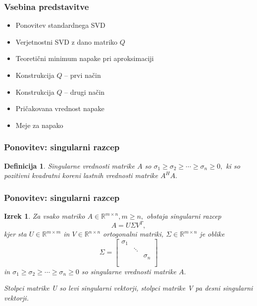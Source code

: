 \documentclass{beamer}
\newtheorem{izrek}{Izrek}
\newtheorem{definicija}{Definicija}
\begin{document}
\begin{frame}
\frametitle{Vsebina predstavitve}

\begin{itemize}
\item Ponovitev standardnega SVD
\item Verjetnostni SVD z dano matriko $Q$
\item Teoretični minimum napake pri aproksimaciji
\item Konstrukcija $Q$ -- prvi način
\item Konstrukcija $Q$ -- drugi način
\item Pričakovana vrednost napake
\item Meje za napako
\end{itemize}


\end{frame}
\begin{frame}
\frametitle{Ponovitev: singularni razcep}
\begin{definicija}
\emph{Singularne vrednosti} matrike $A$ so $\sigma_1 \geq \sigma_2 \geq \cdots \geq \sigma_n \geq 0,$ ki so pozitivni kvadratni koreni  lastnih vrednosti matrike $A^HA.$
\end{definicija}

\end{frame}


\begin{frame}
\frametitle{Ponovitev: singularni razcep}


\begin{izrek}
Za vsako matriko $A \in \mathbb{R}^{m \times n}, m \geq n,$ obstaja singularni razcep $$A = U \Sigma V^T,$$ kjer sta $U \in \mathbb{R}^{m \times m}$ in $V \in \mathbb{R}^{n \times n}$ ortogonalni matriki, $\Sigma \in \mathbb{R}^{m \times n}$ je oblike
$$\Sigma =
\begin{bmatrix}
    \sigma_1 & \\
     & \ddots \\
    & & \sigma_n\\
&&\\
\end{bmatrix}
$$
in 
 $\sigma_1 \geq \sigma_2 \geq \cdots \geq \sigma_n \geq 0$ so singularne vrednosti matrike $A.$

Stolpci matrike U so levi singularni vektorji, stolpci matrike V pa desni singularni vektorji.
\end{izrek}

\end{frame}
\end{document}
